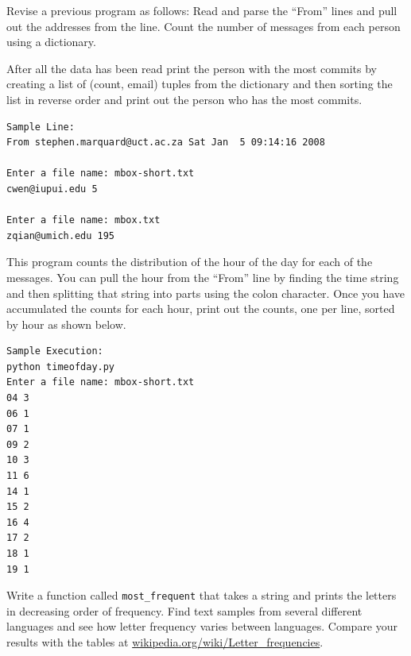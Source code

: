 \documentclass[10pt]{book}
\begin{document}
\begin{ex}
Revise a previous program as follows:  Read and 
parse the ``From'' lines and pull out the 
addresses from the line.   Count the number of
messages from each person using a dictionary.

After all the data has been read print 
the person with the most commits by creating
a list of (count, email) tuples from the 
dictionary and then sorting the list in reverse
order and print out the person who has the most
commits.

\beforeverb
\begin{verbatim}
Sample Line:
From stephen.marquard@uct.ac.za Sat Jan  5 09:14:16 2008

Enter a file name: mbox-short.txt
cwen@iupui.edu 5

Enter a file name: mbox.txt
zqian@umich.edu 195
\end{verbatim}
\afterverb
\end{ex}
\begin{ex}
This program counts the distribution of the hour of the day for 
each of the messages. You can pull the hour from the ``From'' 
line by finding the time string and then splitting that string 
into parts using the colon character. Once you have accumulated 
the counts for each hour, print out the counts, one per line, 
sorted by hour as shown below. 
\beforeverb
\begin{verbatim}
Sample Execution:
python timeofday.py
Enter a file name: mbox-short.txt
04 3
06 1
07 1
09 2
10 3
11 6
14 1
15 2
16 4
17 2
18 1
19 1
\end{verbatim}
\afterverb
\end{ex}


\begin{ex}
Write a function called \verb"most_frequent" that takes a string and
prints the letters in decreasing order of frequency.  Find text
samples from several different languages and see how letter frequency
varies between languages.  Compare your results with the tables at
\url{wikipedia.org/wiki/Letter_frequencies}.


\end{ex}





\end{document}
